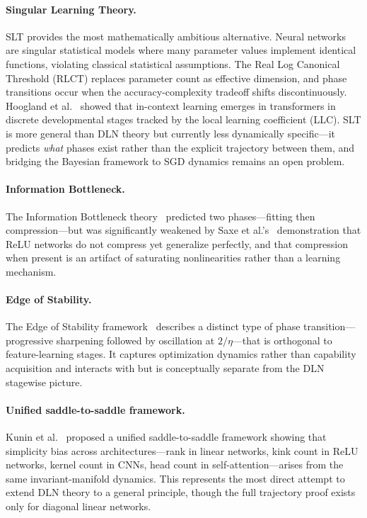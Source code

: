 \documentclass{article}
\theoremstyle{definition}
\begin{document}
\paragraph{Singular Learning Theory.} SLT provides the most mathematically ambitious alternative. Neural networks are singular statistical models where many parameter values implement identical functions, violating classical statistical assumptions. The Real Log Canonical Threshold (RLCT) replaces parameter count as effective dimension, and phase transitions occur when the accuracy-complexity tradeoff shifts discontinuously. Hoogland et al.~\cite{hoogland2024slt} showed that in-context learning emerges in transformers in discrete developmental stages tracked by the local learning coefficient (LLC). SLT is more general than DLN theory but currently less dynamically specific---it predicts \emph{what} phases exist rather than the explicit trajectory between them, and bridging the Bayesian framework to SGD dynamics remains an open problem.

\paragraph{Information Bottleneck.} The Information Bottleneck theory~\cite{shwartzziv2017ib} predicted two phases---fitting then compression---but was significantly weakened by Saxe et al.'s~\cite{saxe2018information} demonstration that ReLU networks do not compress yet generalize perfectly, and that compression when present is an artifact of saturating nonlinearities rather than a learning mechanism.

\paragraph{Edge of Stability.} The Edge of Stability framework~\cite{cohen2021gradient} describes a distinct type of phase transition---progressive sharpening followed by oscillation at $2/\eta$---that is orthogonal to feature-learning stages. It captures optimization dynamics rather than capability acquisition and interacts with but is conceptually separate from the DLN stagewise picture.

\paragraph{Unified saddle-to-saddle framework.} Kunin et al.~\cite{simsek2025saddle} proposed a unified saddle-to-saddle framework showing that simplicity bias across architectures---rank in linear networks, kink count in ReLU networks, kernel count in CNNs, head count in self-attention---arises from the same invariant-manifold dynamics. This represents the most direct attempt to extend DLN theory to a general principle, though the full trajectory proof exists only for diagonal linear networks.
\end{document}
